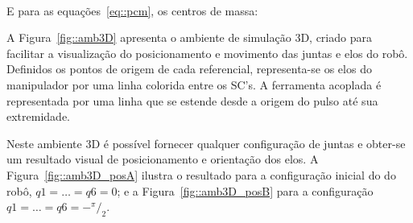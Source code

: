 \bigskip {} \\
 \bigskip 

E para as equações~\ref{eq::pcm}, os centros de massa:

\bigskip {} \bigskip 

A Figura~\ref{fig::amb3D} apresenta o ambiente de simulação 3D, criado para
facilitar a visualização do posicionamento e movimento das juntas e elos do
robô. Definidos os pontos de origem de cada referencial, representa-se os elos
do manipulador por uma linha colorida entre os SC's. A ferramenta acoplada é
representada por uma linha que se estende desde a origem do pulso até sua
extremidade. 

Neste ambiente 3D é possível fornecer qualquer configuração de juntas e obter-se
um resultado visual de posicionamento e orientação dos elos. A
Figura~\ref{fig::amb3D_posA} ilustra o resultado para a configuração inicial do
do robô, $q1 = \ldots = q6 = 0$; e a Figura~\ref{fig::amb3D_posB} para a
configuração $q1 = \ldots = q6 = {-}^{\pi}/_2$.

